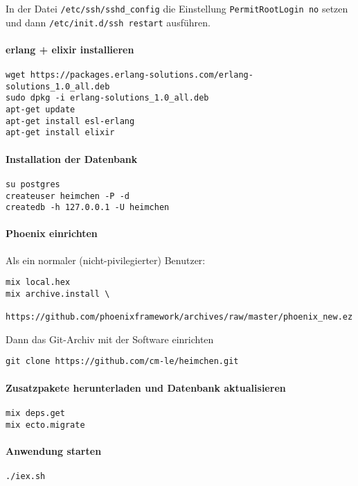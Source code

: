 \documentclass[12pt]{scrreprt}
\begin{document}
In der Datei \verb|/etc/ssh/sshd_config| die Einstellung \verb|PermitRootLogin no| setzen und dann
\verb|/etc/init.d/ssh restart| ausführen.

\paragraph{erlang + elixir installieren}

\begin{verbatim}
wget https://packages.erlang-solutions.com/erlang-solutions_1.0_all.deb 
sudo dpkg -i erlang-solutions_1.0_all.deb
apt-get update
apt-get install esl-erlang
apt-get install elixir
\end{verbatim}


\paragraph{Installation der Datenbank}
\begin{verbatim}
su postgres
createuser heimchen -P -d
createdb -h 127.0.0.1 -U heimchen
\end{verbatim}

\paragraph{Phoenix einrichten}

Als ein normaler (nicht-pivilegierter) Benutzer:

\begin{verbatim}
mix local.hex
mix archive.install \
    https://github.com/phoenixframework/archives/raw/master/phoenix_new.ez
\end{verbatim}


Dann das Git-Archiv mit der Software einrichten

\begin{verbatim}
git clone https://github.com/cm-le/heimchen.git
\end{verbatim}



\paragraph{Zusatzpakete herunterladen und Datenbank aktualisieren}
\begin{verbatim}
mix deps.get
mix ecto.migrate
\end{verbatim}

\paragraph{Anwendung starten}

\begin{verbatim}
./iex.sh
\end{verbatim}
\end{document}
